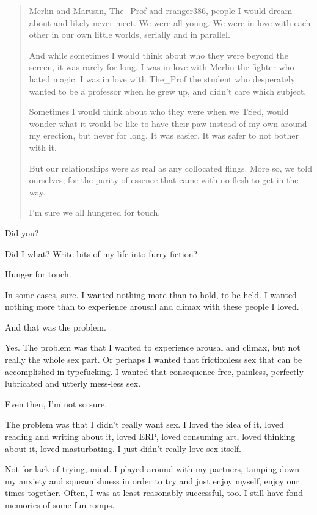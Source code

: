 \begin{paracol}{2}
\begin{leftcolumn}
\begin{quotation}
  Merlin and Marusin, The\_Prof and rranger386, people I would dream about and likely never meet. We were all young. We were in love with each other in our own little worlds, serially and in parallel.

  And while sometimes I would think about who they were beyond the screen, it was rarely for long. I was in love with Merlin the fighter who hated magic. I was in love with The\_Prof the student who desperately wanted to be a professor when he grew up, and didn’t care which subject.

  Sometimes I would think about who they were when we TSed, would wonder what it would be like to have their paw instead of my own around my erection, but never for long. It was easier. It was safer to not bother with it.

  But our relationships were as real as any collocated flings. More so, we told ourselves, for the purity of essence that came with no flesh to get in the way.

  I’m sure we all hungered for touch.
\end{quotation}

\begin{ally}
Did you?
\end{ally}
Did I what? Write bits of my life into furry fiction?

\begin{ally}
Hunger for touch.
\end{ally}
In some cases, sure. I wanted nothing more than to hold, to be held. I wanted nothing more than to experience arousal and climax with these people I loved.

\begin{ally}
And that was the problem.
\end{ally}
Yes. The problem was that I wanted to experience arousal and climax, but not really the whole sex part. Or perhaps I wanted that frictionless sex that can be accomplished in typefucking. I wanted that consequence-free, painless, perfectly-lubricated and utterly mess-less sex.

Even then, I'm not so sure.
\newpage

\noindent The problem was that I didn't really want sex. I loved the idea of it, loved reading and writing about it, loved ERP, loved consuming art, loved thinking about it, loved masturbating. I just didn't really love sex itself.

Not for lack of trying, mind. I played around with my partners, tamping down my anxiety and squeamishness in order to try and just enjoy myself, enjoy our times together. Often, I was at least reasonably successful, too. I still have fond memories of some fun romps.


\end{leftcolumn}
\end{paracol}
